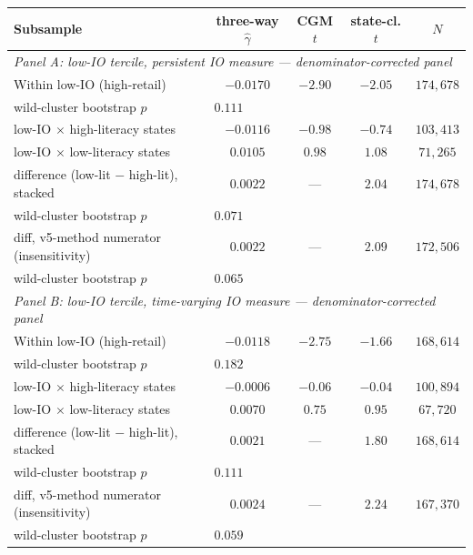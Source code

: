 \begin{tabular}{lcccc}
\hline\hline
Subsample & three-way $\hat\gamma$ & CGM $t$ & state-cl. $t$ & $N$ \\
\hline
\multicolumn{5}{l}{\textit{Panel A: low-IO tercile, persistent IO measure --- denominator-corrected panel}} \\
Within low-IO (high-retail) & $-0.0170$ & $-2.90$ & $-2.05$ & $174,678$ \\
\quad wild-cluster bootstrap $p$ & \multicolumn{4}{l}{$0.111$} \\
\quad low-IO $\times$ high-literacy states & $-0.0116$ & $-0.98$ & $-0.74$ & $103,413$ \\
\quad low-IO $\times$ low-literacy states & $0.0105$ & $0.98$ & $1.08$ & $71,265$ \\
\quad difference (low-lit $-$ high-lit), stacked & $0.0022$ & --- & $2.04$ & $174,678$ \\
\quad\quad wild-cluster bootstrap $p$ & \multicolumn{4}{l}{$0.071$} \\
\quad diff, v5-method numerator (insensitivity) & $0.0022$ & --- & $2.09$ & $172,506$ \\
\quad\quad wild-cluster bootstrap $p$ & \multicolumn{4}{l}{$0.065$} \\
\hline
\multicolumn{5}{l}{\textit{Panel B: low-IO tercile, time-varying IO measure --- denominator-corrected panel}} \\
Within low-IO (high-retail) & $-0.0118$ & $-2.75$ & $-1.66$ & $168,614$ \\
\quad wild-cluster bootstrap $p$ & \multicolumn{4}{l}{$0.182$} \\
\quad low-IO $\times$ high-literacy states & $-0.0006$ & $-0.06$ & $-0.04$ & $100,894$ \\
\quad low-IO $\times$ low-literacy states & $0.0070$ & $0.75$ & $0.95$ & $67,720$ \\
\quad difference (low-lit $-$ high-lit), stacked & $0.0021$ & --- & $1.80$ & $168,614$ \\
\quad\quad wild-cluster bootstrap $p$ & \multicolumn{4}{l}{$0.111$} \\
\quad diff, v5-method numerator (insensitivity) & $0.0024$ & --- & $2.24$ & $167,370$ \\
\quad\quad wild-cluster bootstrap $p$ & \multicolumn{4}{l}{$0.059$} \\
\hline\hline
\end{tabular}
